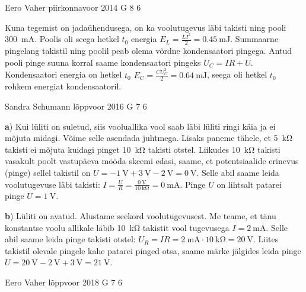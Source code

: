 \documentclass[11pt, twoside]{article}
\begin{document}
{%
{Eero Vaher} %
{piirkonnavoor} %
{2014} %
{G 8} %
{6} %
{

\ifSolution
Kuna tegemist on jadaühendusega, on ka voolutugevus läbi takisti ning pooli \SI{300}{\milli\ampere}. Poolis oli seega hetkel $t_0$ energia $E_L=\frac{LI^2}{2}=\SI{0.45}{\milli\joule}$. Summaarne pingelang takistil ning poolil peab olema võrdne kondensaatori pingega. Antud pooli pinge suuna korral saame kondensaatori pingeks $U_C=IR+U$. Kondensaatori energia on hetkel $t_0$ $E_C=\frac{CU_C^2}{2}=\SI{0.64}{\milli\joule}$, seega oli hetkel $t_0$ rohkem energiat kondensaatoril. 
\fi
}

{Sandra Schumann} %
{lõppvoor} %
{2016} %
{G 7} %
{6} %
{

\ifSolution
{\bf a}) Kui lüliti on suletud, siis vooluallika vool saab läbi lüliti ringi käia ja ei mõjuta midagi. Võime selle asendada juhtmega. Lisaks paneme tähele, et \SI{5}{\kilo\ohm} takisti ei mõjuta kuidagi pinget \SI{10}{\kilo\ohm} takisti otstel. Liikudes \SI{10}{\kilo\ohm} takisti vasakult poolt vastupäeva mööda skeemi edasi, saame, et potentsiaalide erinevus (pinge) sellel takistil on $U = -\SI{1}{\volt} + \SI{3}{\volt} - \SI{2}{\volt} = \SI{0}{\volt}$. Selle abil saame leida voolutugevuse läbi takisti: $I = \frac U R = \frac {\SI{0}{\volt}} {\SI{10}{\kilo\ohm}} = \SI{0}{\milli\ampere}$. Pinge $U$ on lihtsalt patarei pinge $U=\SI{1}{\volt}$.
	
{\bf b}) Lüliti on avatud. Alustame seekord voolutugevusest. Me teame, et tänu konstantse voolu allikale läbib \SI{10}{\kilo\ohm} takistit vool tugevusega $I = \SI{2}{\milli\ampere}$. Selle abil saame leida pinge takisti otstel: $U_R = IR = \SI{2}{\milli\ampere} \cdot \SI{10}{\kilo\ohm} = \SI{20}{\volt}$. Liites takistil olevale pingele kahe patarei pinged otsa, saame märke jälgides leida pinge $U = \SI{20}{\volt} - \SI{2}{\volt} + \SI{3}{\volt} = \SI{21}{\volt}$.
\fi
}

{Eero Vaher} %
{lõppvoor} %
{2018} %
{G 7} %
{6} %
{

}}
\end{document}
